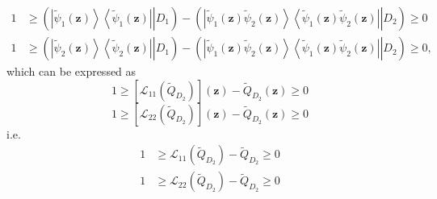 \documentclass[aps,preprint]{revtex4}%
\begin{document}
\begin{enumerate}
\begin{align}
1  &  \geq\left(  \left.  \left\vert \tilde{\psi}_{1}\left(  \mathbf{z}%
\right)  \right\rangle \left\langle \tilde{\psi}_{1}\left(  \mathbf{z}\right)
\right\vert \right\vert D_{1}\right)  -\left(  \left.  \left\vert \tilde{\psi
}_{1}\left(  \mathbf{z}\right)  \tilde{\psi}_{2}\left(  \mathbf{z}\right)
\right\rangle \left\langle \tilde{\psi}_{1}\left(  \mathbf{z}\right)
\tilde{\psi}_{2}\left(  \mathbf{z}\right)  \right\vert \right\vert
D_{2}\right)  \geq0\nonumber\\
1  &  \geq\left(  \left.  \left\vert \tilde{\psi}_{2}\left(  \mathbf{z}%
\right)  \right\rangle \left\langle \tilde{\psi}_{2}\left(  \mathbf{z}\right)
\right\vert \right\vert D_{1}\right)  -\left(  \left.  \left\vert \tilde{\psi
}_{1}\left(  \mathbf{z}\right)  \tilde{\psi}_{2}\left(  \mathbf{z}\right)
\right\rangle \left\langle \tilde{\psi}_{1}\left(  \mathbf{z}\right)
\tilde{\psi}_{2}\left(  \mathbf{z}\right)  \right\vert \right\vert
D_{2}\right)  \geq0,
\end{align}
which can be expressed as
\begin{equation}
1\geq\left[  \mathcal{L}_{11}\left(  \tilde{Q}_{D_{2}}\right)  \right]
\left(  \mathbf{z}\right)  -\tilde{Q}_{D_{2}}\left(  \mathbf{z}\right)  \geq0
\end{equation}%
\begin{equation}
1\geq\left[  \mathcal{L}_{22}\left(  \tilde{Q}_{D_{2}}\right)  \right]
\left(  \mathbf{z}\right)  -\tilde{Q}_{D_{2}}\left(  \mathbf{z}\right)  \geq0
\end{equation}
i.e.
\begin{align}
1  &  \geq\mathcal{L}_{11}\left(  \tilde{Q}_{D_{2}}\right)  -\tilde{Q}_{D_{2}%
}\geq0\\
1  &  \geq\mathcal{L}_{22}\left(  \tilde{Q}_{D_{2}}\right)  -\tilde{Q}_{D_{2}%
}\geq0
\end{align}



\end{enumerate}
\end{document}
